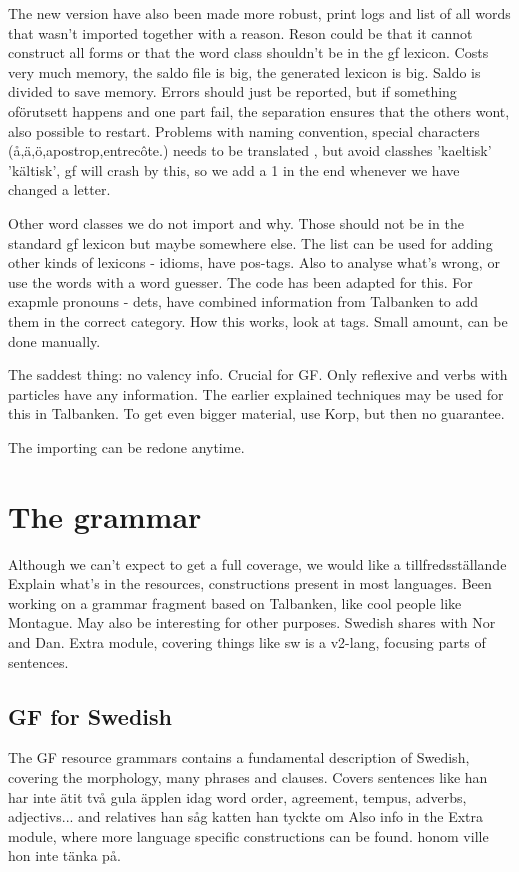 \documentclass{report}
\begin{document}
The new version have also been made more robust, print logs and list of all
words that wasn't imported together with a reason. Reson could be that it
cannot construct all forms or that the word class shouldn't be in the gf lexicon.
Costs very much memory, the saldo file is big, the generated lexicon is big.
Saldo is divided to save memory. Errors should just be reported, but if something oförutsett
happens and one part fail, the separation ensures that the others wont, also
possible to restart. Problems with naming convention, special
characters (å,ä,ö,apostrop,entrecôte.) needs to be translated , but avoid
classhes 'kaeltisk' 'kältisk', gf will crash by this, so we add a 1
in the end whenever we have changed a letter.

Other word classes we do not import and why.
Those should not be in the standard gf lexicon but maybe somewhere else.
The list can be used for adding other kinds of lexicons - idioms, have pos-tags.
Also to analyse what's wrong, or use the words with a word guesser. The code
has been adapted for this.
For exapmle pronouns - dets, have combined information from Talbanken to add them in the correct
category. How this works, look at tags. Small amount, can be done manually.

The saddest thing: no valency info. Crucial for GF. Only reflexive and verbs with particles
have any information. The earlier explained techniques may be used for this in Talbanken.
To get even bigger material, use Korp, but then no guarantee.

The importing can be redone anytime.

\section{The grammar}
Although we can't expect to get a full coverage, we would like a tillfredsställande
Explain what's in the resources, constructions present in most languages. 
Been working on a grammar fragment based on Talbanken,
like cool people like Montague. May also be interesting for other purposes.
Swedish shares with Nor and Dan. Extra module, covering things like sw is a
v2-lang, focusing parts of sentences. 



\subsection{GF for Swedish}
The GF resource grammars contains a fundamental description of Swedish,
covering the morphology, many phrases and clauses.
Covers sentences like
han har inte ätit två gula äpplen idag
word order, agreement, tempus, adverbs, adjectivs...
and relatives
han såg katten han tyckte om
Also info in the Extra module, where more language specific constructions
can be found.
honom ville hon inte tänka på.
\end{document}
